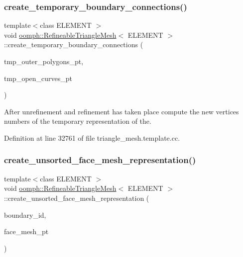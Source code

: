 \subsubsection{\texorpdfstring{create\+\_\+temporary\+\_\+boundary\+\_\+connections()}{create\_temporary\_boundary\_connections()}}
{\footnotesize\ttfamily template$<$class E\+L\+E\+M\+E\+NT $>$ \\
void \hyperlink{classoomph_1_1RefineableTriangleMesh}{oomph\+::\+Refineable\+Triangle\+Mesh}$<$ E\+L\+E\+M\+E\+NT $>$\+::create\+\_\+temporary\+\_\+boundary\+\_\+connections (\begin{DoxyParamCaption}\item[{Vector$<$ Triangle\+Mesh\+Polygon $\ast$$>$ \&}]{tmp\+\_\+outer\+\_\+polygons\+\_\+pt,  }\item[{Vector$<$ Triangle\+Mesh\+Open\+Curve $\ast$$>$ \&}]{tmp\+\_\+open\+\_\+curves\+\_\+pt }\end{DoxyParamCaption})\hspace{0.3cm}{\ttfamily [protected]}}



After unrefinement and refinement has taken place compute the new vertices numbers of the temporary representation of the. 



Definition at line 32761 of file triangle\+\_\+mesh.\+template.\+cc.

\mbox{\label{classoomph_1_1RefineableTriangleMesh_ab1268ab0f9ea49ef262e51a0e90136b5}} 
\subsubsection{\texorpdfstring{create\+\_\+unsorted\+\_\+face\+\_\+mesh\+\_\+representation()}{create\_unsorted\_face\_mesh\_representation()}}
{\footnotesize\ttfamily template$<$class E\+L\+E\+M\+E\+NT $>$ \\
void \hyperlink{classoomph_1_1RefineableTriangleMesh}{oomph\+::\+Refineable\+Triangle\+Mesh}$<$ E\+L\+E\+M\+E\+NT $>$\+::create\+\_\+unsorted\+\_\+face\+\_\+mesh\+\_\+representation (\begin{DoxyParamCaption}\item[{const unsigned \&}]{boundary\+\_\+id,  }\item[{Mesh $\ast$}]{face\+\_\+mesh\+\_\+pt }\end{DoxyParamCaption})\hspace{0.3cm}{\ttfamily [protected]}}



